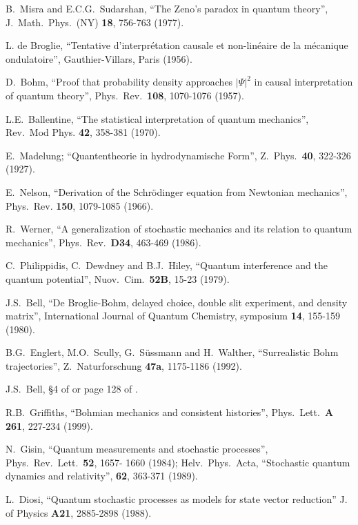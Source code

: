 \documentclass[12pt,onecolumn]{article}%
\begin{document}
\begin{thebibliography}{999}
B.\ Misra and E.C.G.\ Sudarshan, ``The Zeno's paradox in
quantum theory'', J.\ Math.\ Phys.\ (NY) \textbf{18}, 756-763 (1977).

L. de Broglie, ``Tentative d'interpr\'{e}tation causale
et non-lin\'{e}aire de la m\'{e}canique ondulatoire'', Gauthier-Villars, Paris (1956).

D.\ Bohm, ``Proof that probability density approaches $\left|
\Psi\right|  ^{2}$ in causal interpretation of quantum theory'',
Phys.\ Rev.\ \textbf{108}, 1070-1076 (1957).

L.E.\ Ballentine, ``The statistical interpretation of
quantum mechanics'', Rev.\ Mod Phys. \textbf{42}, 358-381 (1970).

E.\ Madelung; ``Quantentheorie in hydrodynamische Form'',
Z.\ Phys.\ \textbf{40}, 322-326 (1927).

E.\ Nelson, ``Derivation of the Schr\"{o}dinger equation from
Newtonian mechanics'', Phys.\ Rev. \textbf{150}, 1079-1085 (1966).

R.\ Werner, ``A generalization of stochastic mechanics and
its relation to quantum mechanics'', Phys.\ Rev.\ \textbf{D34}, 463-469 (1986).

C.\ Philippidis, C.\ Dewdney and B.J.\ Hiley, ``Quantum
interference and the quantum potential'', Nuov.\ Cim.\ \textbf{52B}, 15-23 (1979).

J.S.\ Bell, ``De Broglie-Bohm, delayed choice, double slit
experiment, and density matrix'', International Journal of Quantum Chemistry,
symposium \textbf{14}, 155-159 (1980).

B.G.\ Englert, M.O.\ Scully, G.\ S\"{u}ssmann and
H.\ Walther, ``Surrealistic Bohm trajectories'', Z.\ Naturforschung
\textbf{47a}, 1175-1186 (1992).

J.S.\ Bell, \S 4 of \cite{Bell-speakable} or page 128 of
\cite{Bell-livre}.

R.B.\ Griffiths, ``Bohmian mechanics and consistent
histories'', Phys.\ Lett.\ \textbf{A 261}, 227-234 (1999).

N.\ Gisin, ``Quantum measurements and stochastic
processes'', Phys.\ Rev.\ Lett.\ \textbf{52}, 1657- 1660 (1984);
Helv.\ Phys.\ Acta, ``Stochastic quantum dynamics and relativity'',
\textbf{62}, 363-371 (1989).

L.\ Diosi, ``Quantum stochastic processes as models for state
vector reduction'' J. of Physics \textbf{A21}, 2885-2898 (1988).


\end{thebibliography}
\end{document}
